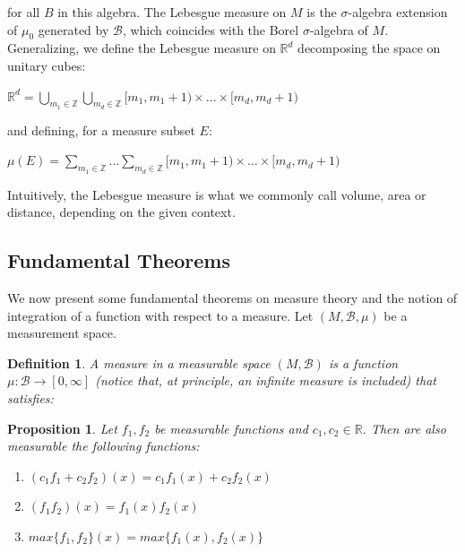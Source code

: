 \documentclass[a4paper,12pt] {article}
\newtheorem{definition}{Definition}[section]
\newtheorem{proposition}{Proposition}[section]
\begin{document}
 \noindent for all $B$ in this algebra. The Lebesgue measure on $M$ is the $\sigma$-algebra extension of $\mu_0$ generated by $\mathcal{B}$, which coincides with the Borel $\sigma$-algebra of $M$.\\
 Generalizing, we define the Lebesgue measure on $\mathbb{R}^{d}$ decomposing the space on unitary cubes:

\begin{center}
    $\mathbb{R}^{d} = \displaystyle \bigcup_{m_1 \in \mathbb{Z}}  \displaystyle \bigcup_{m_d \in \mathbb{Z}} [m_1,m_1 +1)\times\dots\times [m_d, m_d + 1)$
\end{center}

\noindent and defining, for a measure subset $E$:
\begin{center}
    $\mu(E) = \displaystyle \sum_{m_1 \in \mathbb{Z}} \dots \displaystyle \sum_{m_d \in \mathbb{Z}} [m_1,m_1 +1)\times\dots\times [m_d, m_d + 1)$ 
\end{center}

\indent Intuitively, the Lebesgue measure is what we commonly call volume, area or distance, depending on the given context.

\subsection{Fundamental Theorems}
We now present some fundamental theorems on measure theory and the notion of integration of a function with respect to a measure. Let $(M,\mathcal{B},\mu)$ be a measurement space.\\

\begin{definition}
    A measure in a measurable space $(M,\mathcal{B})$ is a function $\mu : \mathcal{B} \to [0,\infty]$ (notice that, at principle, an infinite measure is included) that satisfies:
\end{definition}

\begin{proposition}
Let $f_1,f_2$ be measurable functions and $c_1,c_2 \in \mathbb{R}$. Then are also measurable the following functions:
\begin{enumerate}
    \item $(c_1 f_1 + c_2 f_2)(x) = c_1 f_1(x) + c_2 f_2(x)$
    \item $(f_1 f_2)(x) = f_1(x)f_2(x)$
    \item $max\{f_1,f_2\}(x) = max\{f_1(x),f_2(x)\}$\\
\end{enumerate}
\end{proposition}
\end{document}
